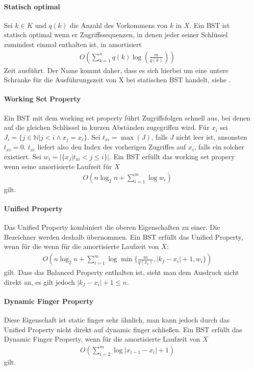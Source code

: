 \documentclass[a4paper,12pt]{article}
\begin{document}
\paragraph{Statisch optimal}
Sei $k \in K$ und $q(k)$ die Anzahl des Vorkommens von $k$ in  $X$. Ein BST ist statisch optimal wenn er Zugriffssequenzen, in denen jeder seiner Schlüssel zumindest einmal enthalten ist, in amortisiert 
\begin{align*}
O\left(\sum_{k = 1}^{n}q(k)\log \left( \frac{m}{q(k)} \right)\right) 
\end{align*}
Zeit ausführt. Der Name kommt daher, dass es sich hierbei um eine untere Schranke für die Ausführungszeit von X bei statischen BST handelt, siehe \cite{staticOptimal}.

\paragraph{Working Set Property}
Ein BST mit dem working set property führt Zugriffsfolgen schnell aus, bei denen auf die gleichen Schlüssel in kurzen Abständen zugegriffen wird.
Für $x_i$ sei $J_i = \{j \in \mathbb{N} \vert j < i \land x_j = x_i \}$.
Sei $t_{xi} = \max \left(J\right)$, falls $J$ nicht leer ist, ansonsten $t_{xi} = 0$. $t_{xi}$ liefert also den Index des vorherigen Zugriffes auf $x_i$, falls ein solcher existiert. Sei ${w_i = \vert\{x_j \vert t_{xi} < j \leq i   \} \vert }$.
Ein BST erfüllt das working set propery wenn seine amortisierte Laufzeit für $X$
\begin{align*}
O\left(n \log_2 n + \sum_{i = 1}^{m} \log w_i \right)
\end{align*} 
gilt. 


\paragraph{Unified Property}
Das Unified Property kombiniert die oberen Eigenschaften zu einer. Die Bezeichner werden deshalb übernommen.
Ein BST erfüllt das Unified Property, wenn für die  wenn für die amortisierte Laufzeit von $X$: 
\begin{align*}
O\left(n \log_2 n +     \sum_{i = 1}^{m} \log \min\{ \frac{m}{q\left(x_i\right)}, \vert k_f - x_i  \vert + 1 ,w_i  \}	 		\right)
\end{align*} 
gilt. Dass das Balanced Property enthalten ist, sieht man dem Ausdruck nicht direkt an, es gilt jedoch $\vert k_f - x_i  \vert + 1 \leq n$.




\paragraph{Dynamic Finger Property}
Diese Eigenschaft ist static finger sehr ähnlich, man kann jedoch durch das Unified Property nicht direkt auf dynamic finger schließen. 
Ein BST erfüllt das Dynamic Finger Property, wenn für die amortisierte Laufzeit von $X$
\begin{align*}
O\left( \sum_{i = 2}^{m} \log \vert x_{i-1} - x_i  \vert	+ 1	\right)
\end{align*} 
gilt. 
 
\end{document}

